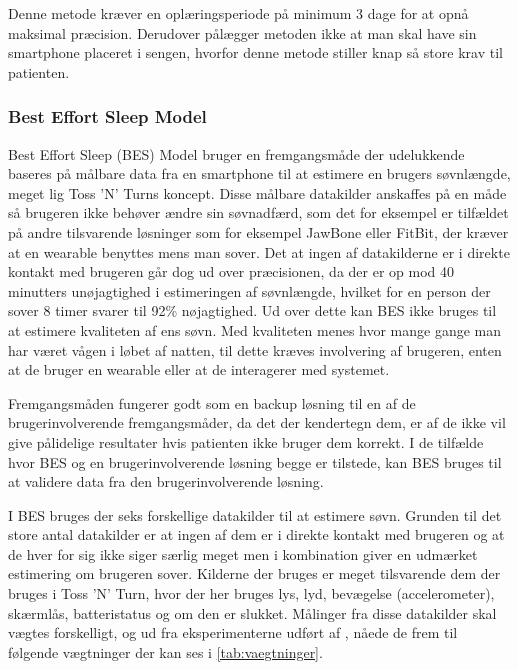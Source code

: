 Denne metode kræver en oplæringsperiode på minimum 3 dage for at opnå maksimal præcision.
Derudover pålægger metoden ikke at man skal have sin smartphone placeret i sengen, hvorfor denne metode stiller knap så store krav til patienten.

\subsubsection{Best Effort Sleep Model}\label{sec:BES}
Best Effort Sleep (BES) Model \citet{6563918} bruger en fremgangsmåde der udelukkende baseres på målbare data fra en smartphone til at estimere en brugers søvnlængde, meget lig Toss 'N' Turns koncept.
Disse målbare datakilder anskaffes på en måde så brugeren ikke behøver ændre sin søvnadfærd, som det for eksempel er tilfældet på andre tilsvarende løsninger som for eksempel JawBone eller FitBit, der kræver at en wearable benyttes mens man sover.
Det at ingen af datakilderne er i direkte kontakt med brugeren går dog ud over præcisionen, da der er op mod 40 minutters unøjagtighed i estimeringen af søvnlængde, hvilket for en person der sover 8 timer svarer til 92\% nøjagtighed.
Ud over dette kan BES ikke bruges til at estimere kvaliteten af ens søvn.
Med kvaliteten menes hvor mange gange man har været vågen i løbet af natten, til dette kræves involvering af brugeren, enten at de bruger en wearable eller at de interagerer med systemet.

Fremgangsmåden fungerer godt som en backup løsning til en af de brugerinvolverende fremgangsmåder, da det der kendertegn dem, er af de ikke vil give pålidelige resultater hvis patienten ikke bruger dem korrekt.
I de tilfælde hvor BES og en brugerinvolverende løsning begge er tilstede, kan BES bruges til at validere data fra den brugerinvolverende løsning. 

I BES bruges der seks forskellige datakilder til at estimere søvn.
Grunden til det store antal datakilder er at ingen af dem er i direkte kontakt med brugeren og at de hver for sig ikke siger særlig meget men i kombination giver en udmærket estimering om brugeren sover.
Kilderne der bruges er meget tilsvarende dem der bruges i Toss 'N' Turn, hvor der her bruges lys, lyd, bevægelse (accelerometer), skærmlås, batteristatus og om den er slukket.
Målinger fra disse datakilder skal vægtes forskelligt, og ud fra eksperimenterne udført af \citet{6563918}, nåede de frem til følgende vægtninger der kan ses i \cref{tab:vaegtninger}.

